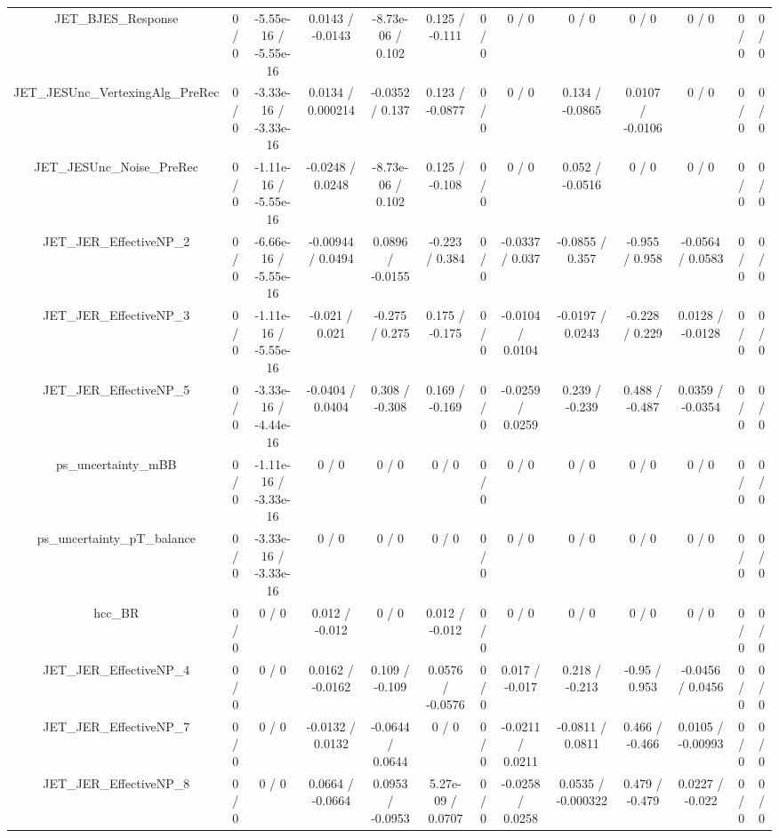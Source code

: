 \documentclass[10pt]{article}
\begin{document}
\begin{table}[htbp]
\begin{center}
\begin{tabular}{|c|c|c|c|c|c|c|c|c|c|c|c|c|}
  JET_BJES_Response & 0 / 0 & -5.55e-16 / -5.55e-16 & 0.0143 / -0.0143 & -8.73e-06 / 0.102 & 0.125 / -0.111 & 0 / 0 & 0 / 0 & 0 / 0 & 0 / 0 & 0 / 0 & 0 / 0 & 0 / 0 \\ 
  JET_JESUnc_VertexingAlg_PreRec & 0 / 0 & -3.33e-16 / -3.33e-16 & 0.0134 / 0.000214 & -0.0352 / 0.137 & 0.123 / -0.0877 & 0 / 0 & 0 / 0 & 0.134 / -0.0865 & 0.0107 / -0.0106 & 0 / 0 & 0 / 0 & 0 / 0 \\ 
  JET_JESUnc_Noise_PreRec & 0 / 0 & -1.11e-16 / -5.55e-16 & -0.0248 / 0.0248 & -8.73e-06 / 0.102 & 0.125 / -0.108 & 0 / 0 & 0 / 0 & 0.052 / -0.0516 & 0 / 0 & 0 / 0 & 0 / 0 & 0 / 0 \\ 
  JET_JER_EffectiveNP_2 & 0 / 0 & -6.66e-16 / -5.55e-16 & -0.00944 / 0.0494 & 0.0896 / -0.0155 & -0.223 / 0.384 & 0 / 0 & -0.0337 / 0.037 & -0.0855 / 0.357 & -0.955 / 0.958 & -0.0564 / 0.0583 & 0 / 0 & 0 / 0 \\ 
  JET_JER_EffectiveNP_3 & 0 / 0 & -1.11e-16 / -5.55e-16 & -0.021 / 0.021 & -0.275 / 0.275 & 0.175 / -0.175 & 0 / 0 & -0.0104 / 0.0104 & -0.0197 / 0.0243 & -0.228 / 0.229 & 0.0128 / -0.0128 & 0 / 0 & 0 / 0 \\ 
  JET_JER_EffectiveNP_5 & 0 / 0 & -3.33e-16 / -4.44e-16 & -0.0404 / 0.0404 & 0.308 / -0.308 & 0.169 / -0.169 & 0 / 0 & -0.0259 / 0.0259 & 0.239 / -0.239 & 0.488 / -0.487 & 0.0359 / -0.0354 & 0 / 0 & 0 / 0 \\ 
  ps_uncertainty_mBB & 0 / 0 & -1.11e-16 / -3.33e-16 & 0 / 0 & 0 / 0 & 0 / 0 & 0 / 0 & 0 / 0 & 0 / 0 & 0 / 0 & 0 / 0 & 0 / 0 & 0 / 0 \\ 
  ps_uncertainty_pT_balance & 0 / 0 & -3.33e-16 / -3.33e-16 & 0 / 0 & 0 / 0 & 0 / 0 & 0 / 0 & 0 / 0 & 0 / 0 & 0 / 0 & 0 / 0 & 0 / 0 & 0 / 0 \\ 
  hcc_BR & 0 / 0 & 0 / 0 & 0.012 / -0.012 & 0 / 0 & 0.012 / -0.012 & 0 / 0 & 0 / 0 & 0 / 0 & 0 / 0 & 0 / 0 & 0 / 0 & 0 / 0 \\ 
  JET_JER_EffectiveNP_4 & 0 / 0 & 0 / 0 & 0.0162 / -0.0162 & 0.109 / -0.109 & 0.0576 / -0.0576 & 0 / 0 & 0.017 / -0.017 & 0.218 / -0.213 & -0.95 / 0.953 & -0.0456 / 0.0456 & 0 / 0 & 0 / 0 \\ 
  JET_JER_EffectiveNP_7 & 0 / 0 & 0 / 0 & -0.0132 / 0.0132 & -0.0644 / 0.0644 & 0 / 0 & 0 / 0 & -0.0211 / 0.0211 & -0.0811 / 0.0811 & 0.466 / -0.466 & 0.0105 / -0.00993 & 0 / 0 & 0 / 0 \\ 
  JET_JER_EffectiveNP_8 & 0 / 0 & 0 / 0 & 0.0664 / -0.0664 & 0.0953 / -0.0953 & 5.27e-09 / 0.0707 & 0 / 0 & -0.0258 / 0.0258 & 0.0535 / -0.000322 & 0.479 / -0.479 & 0.0227 / -0.022 & 0 / 0 & 0 / 0 \\ 

\end{tabular}
\end{center}
\end{table}
\end{document}
